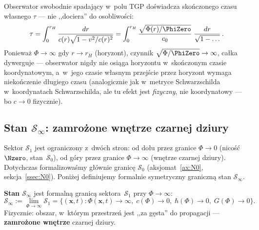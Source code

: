 \begin{corollary}\label{cor:proper-time-finite}
Obserwator swobodnie spadaj\k{a}cy w~polu TGP
do\'swiadcza sko\'nczonego czasu w\l{}asnego $\tau$ ---
nie ,,dociera'' do osobliwo\'sci:
\begin{equation}\label{eq:proper-time}
  \tau = \int_0^{r_H} \frac{dr}{c(r)\sqrt{1 - v^2/c(r)^2}}
  = \int_0^{r_H} \frac{\sqrt{\Phi(r)/\PhiZero}}{c_0}\;
    \frac{dr}{\sqrt{1 - \ldots}}\,.
\end{equation}
Poniewa\.z $\Phi \to \infty$ gdy $r \to r_H$
(horyzont), czynnik $\sqrt{\Phi/\PhiZero} \to \infty$,
ca\l{}ka dywerguje --- obserwator nigdy nie osi\k{a}ga
horyzontu w~sko\'nczonym czasie koordynatowym, a~w~jego
czasie w\l{}asnym przej\'scie przez horyzont wymaga
nieko\'nczenie d\l{}ugiego czasu (analogicznie jak
w~metryce Schwarzschilda w~koordynatach Schwarzschilda,
ale tu efekt jest \emph{fizyczny}, nie koordynatowy ---
bo $c \to 0$ fizycznie).
\end{corollary}

\subsection{Stan $\mathcal{S}_\infty$: zamro\.zone wn\k{e}trze
  czarnej dziury}\label{ssec:s-infty}

Sektor $\mathcal{S}_1$ jest ograniczony z~dw\'och stron:
od do\l{}u przez granice $\Phi \to 0$ (nico\'s\'c $\Nzero$, stan~$\mathcal{S}_0$),
od g\'ory przez granice $\Phi \to \infty$ (wn\k{e}trze czarnej dziury).
Dotychczas formalizowa\'smy g\l{}\'ownie granic\k{e} $\mathcal{S}_0$
(aksjomat~\ref{ax:N0}, sekcja~\ref{ssec:N0}).
Poni\.zej definiujemy formalnie symetryczny graniczn\k{a} stan
$\mathcal{S}_\infty$.

\begin{definition}\label{def:s-infty}
\textbf{Stan $\mathcal{S}_\infty$} jest formaln\k{a} granic\k{a}
sektora~$\mathcal{S}_1$ przy $\Phi \to \infty$:
\begin{equation}\label{eq:s-infty-def}
  \mathcal{S}_\infty
  := \lim_{\Phi \to \infty} \mathcal{S}_1
  = \bigl\{(\mathbf{x}, t) : \Phi(\mathbf{x},t) \to \infty,\;
    c(\Phi) \to 0,\;\hbar(\Phi) \to 0,\;G(\Phi) \to 0\bigr\}.
\end{equation}
Fizycznie: obszar, w~kt\'orym przestrze\'n jest
,,za g\k{e}sta'' do propagacji --- \textbf{zamro\.zone wn\k{e}trze}
czarnej dziury.
\end{definition}


